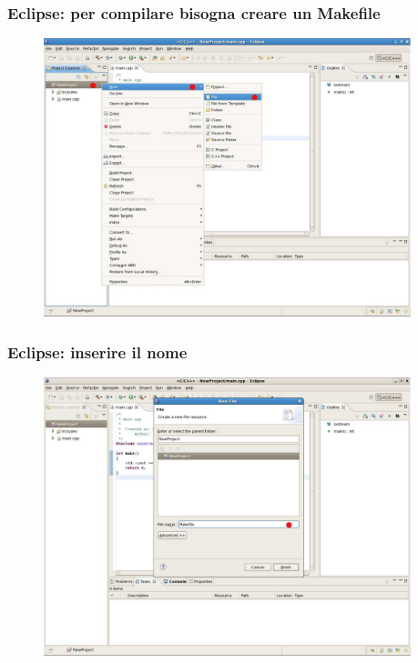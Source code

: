\documentclass{beamer}
\begin{document}

\begin{frame}[fragile]

    \frametitle{Eclipse: per compilare bisogna creare un Makefile}

    \begin{figure}
        \centering
        \includegraphics[width=0.95\textwidth]{./images/eclipse6}
    \end{figure}

\end{frame}


\begin{frame}[fragile]

    \frametitle{Eclipse: inserire il nome}

    \begin{figure}
        \centering
        \includegraphics[width=0.95\textwidth]{./images/eclipse7}
    \end{figure}

\end{frame}
\end{document}
